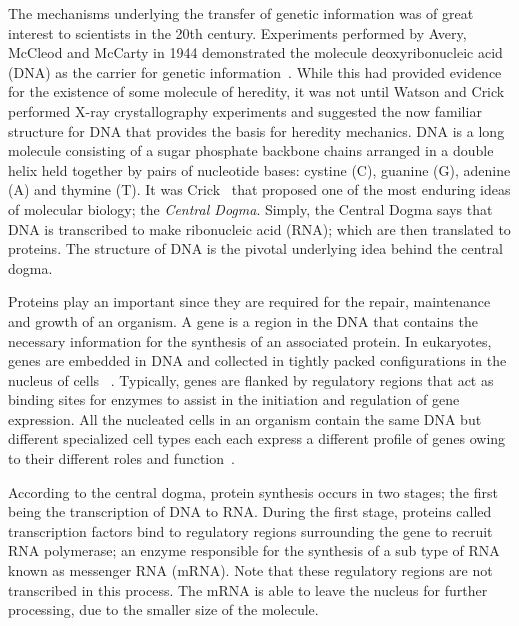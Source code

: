 The mechanisms underlying the transfer of genetic information was of great interest to scientists in the 20th century.
Experiments performed by Avery, McCleod and McCarty in 1944 demonstrated the molecule deoxyribonucleic acid (DNA) as the carrier for genetic information~\cite{macleod1944studies}. While this had provided evidence for the existence of some molecule of heredity, it was not until Watson and Crick~\cite{watson1953structure} performed X-ray crystallography experiments and suggested the now familiar structure for DNA that provides the basis for heredity mechanics. DNA is a long molecule consisting of a sugar phosphate backbone chains arranged in a double helix held together by pairs of nucleotide bases: cystine (C), guanine (G), adenine (A) and thymine (T). It was Crick~\cite{crick1958protein} that proposed one of the most enduring ideas of molecular biology; the \emph{Central Dogma}. Simply, the Central Dogma says that DNA is transcribed to make ribonucleic acid (RNA); which are then translated to proteins. 
The structure of DNA is the pivotal underlying idea behind the central dogma.


Proteins play an important since they are required for the repair, maintenance and growth of an organism. 
A gene is a region in the DNA that contains the necessary information for the synthesis of an associated protein. In eukaryotes, genes are embedded in DNA and collected in tightly packed configurations in the nucleus of cells ~\cite{alberts2002chromosomal}. Typically, genes are flanked by regulatory regions that act as binding sites for enzymes to assist in the initiation and regulation of gene expression.
All the nucleated cells in an organism contain the same DNA but different specialized cell types each each express a different profile of genes owing to their different roles and function~\cite{lockhart2000genomics}. 


According to the central dogma, protein synthesis occurs in two stages; the first being the transcription of DNA to RNA. 
During the first stage, proteins called transcription factors bind to regulatory regions surrounding the gene to recruit RNA polymerase; an enzyme responsible for the synthesis of a sub type of RNA known as messenger RNA (mRNA). Note that these regulatory regions are not transcribed in this process. 
The mRNA is able to leave the nucleus for further processing, due to the smaller size of the molecule. 

